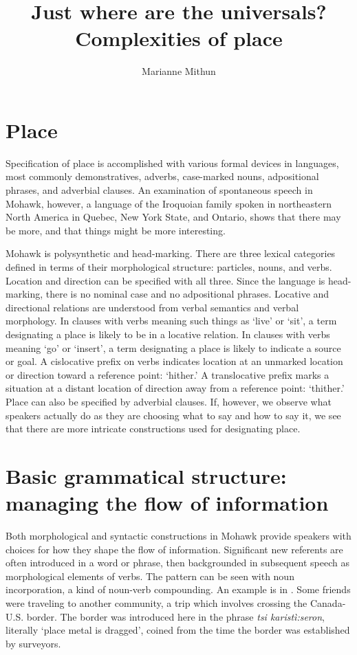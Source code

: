 \documentclass[output=paper,colorlinks,citecolor=brown]{langscibook}
\author{Marianne Mithun\orcid{}\affiliation{University of California, Santa Barbara}}
\title{Just where are the universals? Complexities of place}
\begin{document}
\maketitle

\section{Place}

Specification of place is accomplished with various formal devices in languages, most commonly demonstratives, adverbs, case-marked nouns, adpositional phrases, and adverbial clauses. An examination of spontaneous speech in Mohawk, however, a language of the Iroquoian family spoken in northeastern North America in Quebec, New York State, and Ontario, shows that there may be more, and that things might be more interesting.

Mohawk is polysynthetic and head-marking. There are three lexical categories defined in terms of their morphological structure: particles, nouns, and verbs. Location and direction can be specified with all three. Since the language is head-marking, there is no nominal case and no adpositional phrases. Locative and directional relations are understood from verbal semantics and verbal morphology. In clauses with verbs meaning such things as `live' or `sit', a term designating a place is likely to be in a locative relation. In clauses with verbs meaning `go' or `insert', a term designating a place is likely to indicate a source or goal. A cislocative prefix on verbs indicates location at an unmarked location or direction toward a reference point: `hither.' A translocative prefix marks a situation at a distant location of direction away from a reference point: `thither.' Place can also be specified by adverbial clauses. If, however, we observe what speakers actually do as they are choosing what to say and how to say it, we see that there are more intricate constructions used for designating place. 

\section{Basic grammatical structure: managing the flow of information}
Both morphological and syntactic constructions in Mohawk provide speakers with choices for how they shape the flow of information. Significant new referents are often introduced in a word or phrase, then backgrounded in subsequent speech as morphological elements of verbs. The pattern can be seen with noun incorporation, a kind of noun-verb compounding. An example is in . Some friends were traveling to another community, a trip which involves crossing the Canada-U.S. border. The border was introduced here in the phrase \emph{tsi karistì:seron}, literally `place metal is dragged', coined from the time the border was established by surveyors. 
\end{document}
